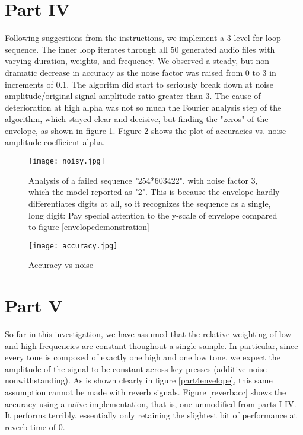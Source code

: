 \documentclass{article}
\begin{document}
\section{Part IV}
Following suggestions from the instructions, we implement a 3-level for loop sequence. The inner loop iterates through all 50 generated audio files with varying duration, weights, and frequency.
We observed a steady, but non-dramatic decrease in accuracy as the noise factor was raised from 0 to 3 in increments of 0.1. The algoritm did start to seriously break down at noise amplitude/original signal amplitude ratio greater than 3.
The cause of deterioration at high alpha was not so much the Fourier analysis step of the algorithm, which stayed clear and decisive, but finding the "zeros" of the envelope, as shown in figure \ref{noisy}. Figure \ref{accuracy} shows the plot of accuracies vs. noise amplitude coefficient alpha.
\begin{figure}[h]
	\texttt{[image: noisy.jpg]}
	\caption{Analysis of a failed sequence "254*603422", with noise factor 3, which the model reported as "2". This is because the envelope hardly differentiates digits at all, so it recognizes the sequence as a single, long digit: Pay special attention to the y-scale of envelope compared to figure \ref{envelopedemonstration}}
	\label{noisy}
\end{figure}

\begin{figure}[h]
	\texttt{[image: accuracy.jpg]}
	\caption{Accuracy vs noise}
	
	\label{accuracy}
\end{figure}

\section{Part V}
So far in this investigation, we have assumed that the relative weighting of low and high frequencies are constant thoughout a single sample. In particular, since every tone is composed of exactly one high and one low tone, we expect the amplitude of the signal to be constant across key presses (additive noise nonwithstanding). As is shown clearly in figure \ref{part4envelope}, this same assumption cannot be made with reverb signals. Figure \ref{reverbacc} shows the accuracy using a naïve implementation, that is, one unmodified from parts I-IV. It performs terribly, essentially only retaining the slightest bit of performance at reverb time of 0.
\end{document}
